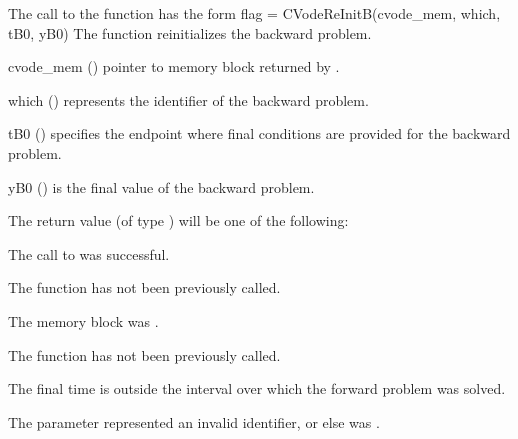 The call to the  function has the form
{
  flag = CVodeReInitB(cvode\_mem, which, tB0, yB0)
}
{
  The function  reinitializes {\cvodes} the backward problem.
}
{
  \begin{args}
  \item[cvode\_mem] ()
    pointer to {\cvodes} memory block returned by .
  \item[which] ()
    represents the identifier of the backward problem.
  \item[tB0] ()
    specifies the endpoint where final conditions are provided for the 
    backward problem.
  \item[yB0] ()
    is the final value of the backward problem. 
  \end{args}
}
{
  The return value  (of type ) will be one of the following:
  \begin{args}
  \item[\Id{CV\_SUCCESS}]
    The call to  was successful.
  \item[\Id{CV\_NO\_MALLOC}]
    The function  has not been previously called.
  \item[\Id{CV\_MEM\_NULL}] 
    The  memory block was .
  \item[\Id{CV\_NO\_ADJ}]
    The function  has not been previously called.
  \item[\Id{CV\_BAD\_TB0}]
    The final time  is outside the interval over which the forward problem
    was solved.
  \item[\Id{CV\_ILL\_INPUT}]
    The parameter  represented an invalid identifier, or else 
     was .
  \end{args}
}
{}

